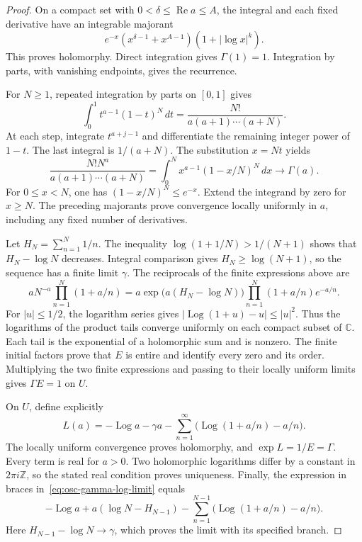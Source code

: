 \begin{proof}
On a compact set with \(0<\delta\leq\operatorname{Re}a\leq A\),
the integral and each fixed derivative have an integrable majorant
\[
 e^{-x}(x^{\delta-1}+x^{A-1})(1+|\log x|^k).
\]
This proves holomorphy. Direct integration gives \(\Gamma(1)=1\).
Integration by parts, with vanishing endpoints, gives the recurrence.

For \(N\geq1\), repeated integration by parts on \([0,1]\) gives
\[
 \int_0^1 t^{a-1}(1-t)^N\,dt
 =\frac{N!}{a(a+1)\cdots(a+N)}.
\]
At each step, integrate \(t^{a+j-1}\) and differentiate the remaining
integer power of \(1-t\). The last integral is \(1/(a+N)\).
The substitution \(x=Nt\) yields
\[
 \frac{N!N^a}{a(a+1)\cdots(a+N)}
 =\int_0^N x^{a-1}(1-x/N)^N\,dx
 \longrightarrow\Gamma(a).
\]
For \(0\leq x<N\), one has \((1-x/N)^N\leq e^{-x}\).
Extend the integrand by zero for \(x\geq N\).
The preceding majorants prove convergence locally uniformly in \(a\),
including any fixed number of derivatives.

Let \(H_N=\sum_{n=1}^N1/n\).
The inequality \(\log(1+1/N)>1/(N+1)\) shows that \(H_N-\log N\)
decreases. Integral comparison gives \(H_N\geq\log(N+1)\), so the
sequence has a finite limit \(\gamma\).
The reciprocals of the finite expressions above are
\[
 aN^{-a}\prod_{n=1}^N(1+a/n)
 =a\exp\bigl(a(H_N-\log N)\bigr)
       \prod_{n=1}^N(1+a/n)e^{-a/n}.
\]
For \(|u|\leq1/2\), the logarithm series gives
\( |\operatorname{Log}(1+u)-u|\leq |u|^2\).
Thus the logarithms of the product tails converge uniformly on each
compact subset of \(\mathbb C\). Each tail is the exponential of a
holomorphic sum and is nonzero. The finite initial factors prove that
\(E\) is entire and identify every zero and its order.
Multiplying the two finite expressions and passing to their locally
uniform limits gives \(\Gamma E=1\) on \(U\).

On \(U\), define explicitly
\[
 L(a)=-\operatorname{Log}a-\gamma a
       -\sum_{n=1}^{\infty}
        \bigl(\operatorname{Log}(1+a/n)-a/n\bigr).
\]
The locally uniform convergence proves holomorphy, and
\(\exp L=1/E=\Gamma\). Every term is real for \(a>0\).
Two holomorphic logarithms differ by a constant in \(2\pi i\mathbb Z\),
so the stated real condition proves uniqueness.
Finally, the expression in braces in~\eqref{eq:osc-gamma-log-limit} equals
\[
 -\operatorname{Log}a+a(\log N-H_{N-1})
 -\sum_{n=1}^{N-1}
        \bigl(\operatorname{Log}(1+a/n)-a/n\bigr).
\]
Here \(H_{N-1}-\log N\to\gamma\), which proves the limit with its
specified branch.
\end{proof}

